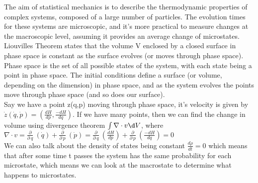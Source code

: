The aim of statistical mechanics is to describe the thermodynamic properties of complex systems, composed of a large number of particles. The evolution times for these systems are microscopic, and it’s more practical to measure changes at the macroscopic level, assuming it provides an average change of microstates.\\
Liouvilles Theorem states that the volume V enclosed by a closed surface in phase space is constant as the surface evolves (or moves through phase space). \\
Phase space is the set of all possible states of the system, with each state being a point in phase space. The initial conditions define a surface (or volume, depending on the dimension) in phase space, and as the system evolves the points move through phase space (and so does our surface). \\
Say we have a point z(q,p) moving through phase space, it’s velocity is given by $\dot z (\dot q,\dot p)=(\frac{dH}{dp}, \frac{-dH}{dq})$. If we have many points, then we can find the change in volume using divergence theorem $\int\nabla\cdot v\d V$, where $\nabla\cdot v=\frac{\partial}{\partial\ q}\ (\dot q)+\frac{\partial}{\partial\ p}\ (\dot p)=\frac{\partial}{\partial\ q}\ (\frac{dH}{dp})+\frac{\partial}{\partial\ p}\ (\frac{-dH}{dq})=0$\\ 

We can also talk about the density of states being constant $\frac{d\rho}{dt} = 0$ which means that after some time t passes the system has the same probability for each microstate, which means we can look at the macrostate to determine what happens to microstates. 
